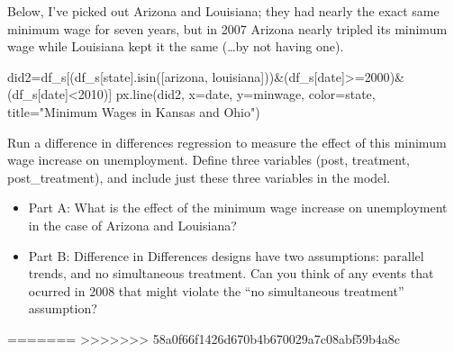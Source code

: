 \documentclass[
  letterpaper,
  DIV=11,
  numbers=noendperiod]{scrreprt}
\newenvironment{Shaded}{\begin{snugshade}}{\end{snugshade}}
\newcommand{\NormalTok}[1]{\textcolor[rgb]{0.00,0.23,0.31}{#1}}
\newcommand{\OperatorTok}[1]{\textcolor[rgb]{0.37,0.37,0.37}{#1}}
\newcommand{\StringTok}[1]{\textcolor[rgb]{0.13,0.47,0.30}{#1}}
\providecommand{\tightlist}{%
  \setlength{\itemsep}{0pt}\setlength{\parskip}{0pt}}\usepackage{longtable,booktabs,array}
\begin{document}
Below, I've picked out Arizona and Louisiana; they had nearly the exact
same minimum wage for seven years, but in 2007 Arizona nearly tripled
its minimum wage while Louisiana kept it the same (\ldots by not having
one).

\begin{Shaded}
\begin{Highlighting}[]
\NormalTok{did2}\OperatorTok{=}\NormalTok{df\_s[(df\_s[}\StringTok{\textquotesingle{}state\textquotesingle{}}\NormalTok{].isin([}\StringTok{\textquotesingle{}arizona\textquotesingle{}}\NormalTok{, }\StringTok{\textquotesingle{}louisiana\textquotesingle{}}\NormalTok{]))}\OperatorTok{\&}\NormalTok{(df\_s[}\StringTok{\textquotesingle{}date\textquotesingle{}}\NormalTok{]}\OperatorTok{\textgreater{}=}\StringTok{\textquotesingle{}2000\textquotesingle{}}\NormalTok{)}\OperatorTok{\&}\NormalTok{ (df\_s[}\StringTok{\textquotesingle{}date\textquotesingle{}}\NormalTok{]}\OperatorTok{\textless{}}\StringTok{\textquotesingle{}2010\textquotesingle{}}\NormalTok{)] }
\NormalTok{px.line(did2, x}\OperatorTok{=}\StringTok{\textquotesingle{}date\textquotesingle{}}\NormalTok{, y}\OperatorTok{=}\StringTok{\textquotesingle{}minwage\textquotesingle{}}\NormalTok{, color}\OperatorTok{=}\StringTok{\textquotesingle{}state\textquotesingle{}}\NormalTok{, title}\OperatorTok{=}\StringTok{"Minimum Wages in Kansas and Ohio"}\NormalTok{)}
\end{Highlighting}
\end{Shaded}

Run a difference in differences regression to measure the effect of this
minimum wage increase on unemployment. Define three variables (post,
treatment, post\_treatment), and include just these three variables in
the model.

\begin{itemize}
\tightlist
\item
  Part A: What is the effect of the minimum wage increase on
  unemployment in the case of Arizona and Louisiana?
\item
  Part B: Difference in Differences designs have two assumptions:
  parallel trends, and no simultaneous treatment. Can you think of any
  events that ocurred in 2008 that might violate the ``no simultaneous
  treatment'' assumption?
\end{itemize}
=======
>>>>>>> 58a0f66f1426d670b4b670029a7c08abf59b4a8c
\end{document}
